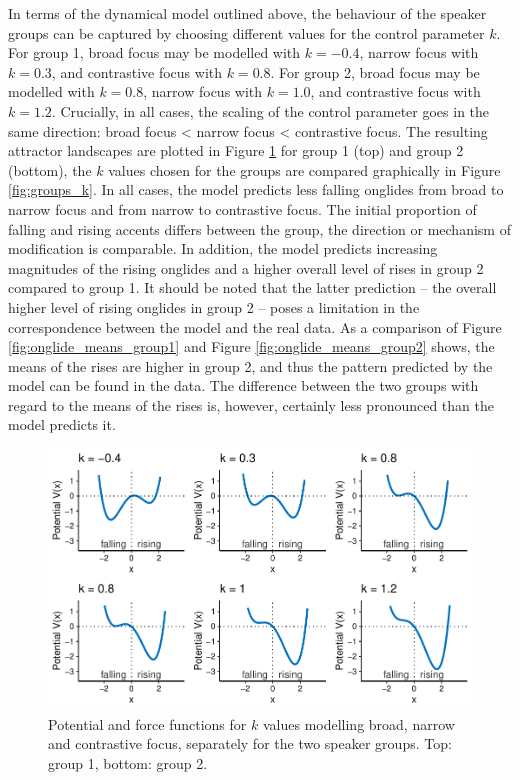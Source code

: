 In terms of the dynamical model outlined above, the behaviour of the speaker groups can be captured by choosing different values for the control parameter $k$. For group 1, broad focus may be modelled with $k = -0.4$, narrow focus with $k = 0.3$, and contrastive focus with $k = 0.8$. For group 2, broad focus may be modelled with $k = 0.8$, narrow focus with $k =  1.0$, and contrastive focus with $k = 1.2$. Crucially, in all cases, the scaling of the control parameter goes in the same direction: broad focus < narrow focus < contrastive focus. The resulting attractor landscapes are plotted in Figure \ref{fig:potentials_groups} for group 1 (top) and group 2 (bottom), the $k$ values chosen for the groups are compared graphically in Figure \ref{fig:groups_k}. In all cases, the model predicts less falling onglides from broad to narrow focus and from narrow to contrastive focus. The initial proportion of falling and rising accents differs between the group, the direction or mechanism of modification is comparable. In addition, the model predicts increasing magnitudes of the rising onglides and a higher overall level of rises in group 2 compared to group 1. It should be noted that the latter prediction -- the overall higher level of rising onglides in group 2 -- poses a limitation in the correspondence between the model and the real data. As a comparison of Figure \ref{fig:onglide_means_group1} and Figure \ref{fig:onglide_means_group2} shows, the means of the rises are higher in group 2, and thus the pattern predicted by the model can be found in the data. The difference between the two groups with regard to the means of the rises is, however, certainly less pronounced than the model predicts it.

\begin{figure}[t]
\includegraphics[width=\textwidth]{figures/ch6/potentials_groups.pdf}
\caption[Potential and force functions for $k$ values modelling broad (left), narrow (centre) and contrastive focus (right), separately for the two speaker groups.]{Potential and force functions for $k$ values modelling broad, narrow and contrastive focus, separately for the two speaker groups. Top: group 1, bottom: group 2.}
\label{fig:potentials_groups}
\end{figure}

